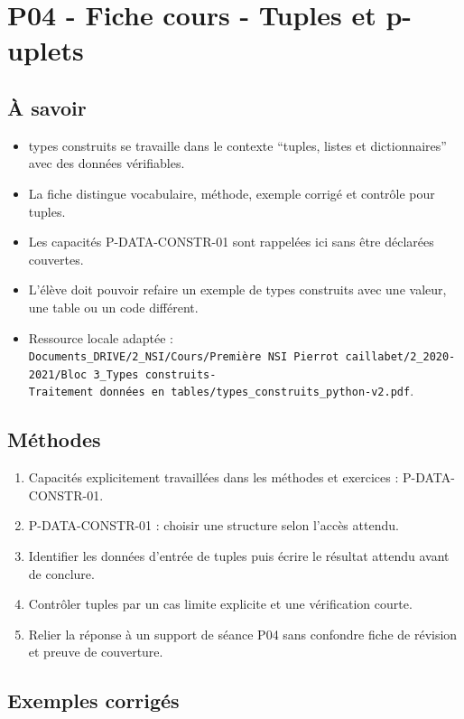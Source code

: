 \section{P04 - Fiche cours - Tuples et p-uplets}

\subsection{À savoir}

\begin{itemize}
\tightlist
\item
  types construits se travaille dans le contexte ``tuples, listes et
  dictionnaires'' avec des données vérifiables.
\item
  La fiche distingue vocabulaire, méthode, exemple corrigé et contrôle
  pour tuples.
\item
  Les capacités P-DATA-CONSTR-01 sont rappelées ici sans être déclarées
  couvertes.
\item
  L'élève doit pouvoir refaire un exemple de types construits avec une
  valeur, une table ou un code différent.
\item
  Ressource locale adaptée :
  \texttt{Documents\_DRIVE/2\_NSI/Cours/Première\ NSI\ Pierrot\ caillabet/2\_2020-2021/Bloc\ 3\_Types\ construits-Traitement\ données\ en\ tables/types\_construits\_python-v2.pdf}.
\end{itemize}

\subsection{Méthodes}

\begin{enumerate}
\def\labelenumi{\arabic{enumi}.}
\tightlist
\item
  Capacités explicitement travaillées dans les méthodes et exercices :
  P-DATA-CONSTR-01.
\item
  P-DATA-CONSTR-01 : choisir une structure selon l'accès attendu.
\item
  Identifier les données d'entrée de tuples puis écrire le résultat
  attendu avant de conclure.
\item
  Contrôler tuples par un cas limite explicite et une vérification
  courte.
\item
  Relier la réponse à un support de séance P04 sans confondre fiche de
  révision et preuve de couverture.
\end{enumerate}

\subsection{Exemples corrigés}

